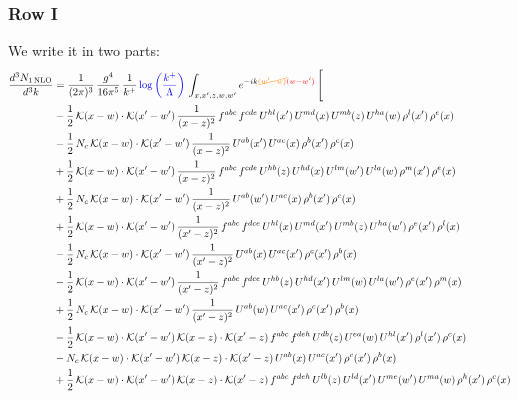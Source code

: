 \documentclass[9pt]{article}
\numberwithin{equation}{section}
\begin{document}
\subsubsection{Row I}
We write it in two parts: 
\begin{align}
\frac{d^{3}N_{1\,\mathrm{NLO}}}{d^{3}k} & = \frac{1}{(2\pi)^{3}}\,\frac{g^{4}}{16\pi^{5}}\,\frac{1}{k^{+}}\,{\color{blue}\log{\left(\frac{k^{+}}{\Lambda}\right)}}\,\int_{x,x',z,w,w'}e^{-ik{\color{orange}\cancel{(w'-w)}}{\color{red}(w-w')}}\,\Bigg[\notag\\ & -\frac{1}{2}\,\mathcal{K}(x-w)\cdot\mathcal{K}(x'-w')\,\frac{1}{(x-z)^{2}}\,f^{abc}\,f^{cde}\,U^{hl}(x')\,U^{md}(x)\,U^{mb}(z)\,U^{ha}(w)\,\rho^{l}(x')\,\rho^{e}(x)\notag\\
& -\frac{1}{2}\,N_{c}\,\mathcal{K}(x-w)\cdot\mathcal{K}(x'-w')\,\frac{1}{(x-z)^{2}}\,U^{ab}(x')\,U^{ac}(x)\,\rho^{b}(x')\,\rho^{c}(x)\notag\\
& +\frac{1}{2}\,\mathcal{K}(x-w)\cdot\mathcal{K}(x'-w')\,\frac{1}{(x-z)^{2}}\,f^{abc}\,f^{cde}\,U^{hb}(z)\,U^{hd}(x)\,U^{lm}(w')\,U^{la}(w)\,\rho^{m}(x')\,\rho^{e}(x)\notag\\
& +\frac{1}{2}\,N_{c}\,\mathcal{K}(x-w)\cdot\mathcal{K}(x'-w')\,\frac{1}{(x-z)^{2}}\,U^{ab}(w')\,U^{ac}(x)\,\rho^{b}(x')\,\rho^{c}(x)\notag\\
& +\frac{1}{2}\,\mathcal{K}(x-w)\cdot\mathcal{K}(x'-w')\,\frac{1}{(x'-z)^{2}}\,f^{abc}\,f^{dce}\,U^{hl}(x)\,U^{md}(x')\,U^{mb}(z)\,U^{ha}(w')\,\rho^{e}(x')\,\rho^{l}(x)\notag\\
& -\frac{1}{2}\,N_{c}\,\mathcal{K}(x-w)\cdot\mathcal{K}(x'-w')\,\frac{1}{(x'-z)^{2}}\,U^{ab}(x)\,U^{ac}(x')\,\rho^{c}(x')\,\rho^{b}(x)\notag\\
& -\frac{1}{2}\,\mathcal{K}(x-w)\cdot\mathcal{K}(x'-w')\,\frac{1}{(x'-z)^{2}}\,f^{abc}\,f^{dce}\,U^{hb}(z)\,U^{hd}(x')\,U^{lm}(w)\,U^{la}(w')\,\rho^{e}(x')\,\rho^{m}(x)\notag\\
& +\frac{1}{2}\,N_{c}\,\mathcal{K}(x-w)\cdot\mathcal{K}(x'-w')\,\frac{1}{(x'-z)^{2}}\,U^{ab}(w)\,U^{ac}(x')\,\rho^{c}(x')\,\rho^{b}(x)\notag\\
& -\frac{1}{2}\,\mathcal{K}(x-w)\cdot\mathcal{K}(x'-w')\,\mathcal{K}(x-z)\cdot\mathcal{K}(x'-z)\,f^{abc}\,f^{deh}\,U^{db}(z)\,U^{ea}(w)\,U^{hl}(x')\,\rho^{l}(x')\,\rho^{c}(x)\notag\\
& -N_{c}\,\mathcal{K}(x-w)\cdot\mathcal{K}(x'-w')\,\mathcal{K}(x-z)\cdot\mathcal{K}(x'-z)\,U^{ab}(x)\,U^{ac}(x')\,\rho^{c}(x')\,\rho^{b}(x)\notag\\
& +\frac{1}{2}\,\mathcal{K}(x-w)\cdot\mathcal{K}(x'-w')\,\mathcal{K}(x-z)\cdot\mathcal{K}(x'-z)\,f^{abc}\,f^{deh}\,U^{lb}(z)\,U^{ld}(x')\,U^{me}(w')\,U^{ma}(w)\,\rho^{h}(x')\,\rho^{c}(x)\notag\\

\end{align}
\end{document}
